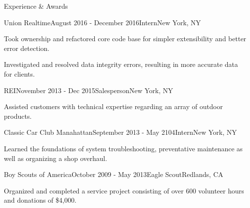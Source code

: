 \documentclass{resume} %
\begin{document}
\begin{rSection}{Experience \& Awards}

\begin{rSubsection}{Union Realtime}{August 2016 - December 2016}{Intern}{New York, NY}
\item Took ownership and refactored core code base for simpler extensibility and better error detection.
\item Investigated and resolved data integrity errors, resulting in more accurate data for clients.
\end{rSubsection}


\begin{rSubsection}{REI}{November 2013 - Dec 2015}{Salesperson}{New York, NY}
\item Assisted customers with technical expertise regarding an array of outdoor products.
\end{rSubsection}

\begin{rSubsection}{Classic Car Club Manahattan}{September 2013 - May 2104}{Intern}{New York, NY}
\item Learned the foundations of system troubleshooting, preventative maintenance as well as organizing a shop overhaul.

\end{rSubsection}

\begin{rSubsection}{Boy Scouts of America}{October 2009 - May 2013}{Eagle Scout}{Redlands, CA}
\item Organized and completed a service project consisting of over 600 volunteer hours and donations of \$4,000.
\end{rSubsection}

\end{rSection}

\end{document}
